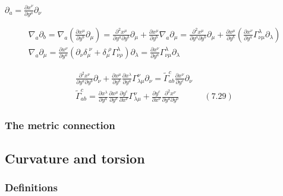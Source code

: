 \documentclass[twoside]{amsart}
\begin{document}
$\partial_a = \frac{ \partial x^{\nu} }{ \partial y^{\mu} } \partial_{\nu}$


\[
\begin{gathered}
  \nabla_a \partial_b = \nabla_a \left( \frac{ \partial x^{\mu }}{ \partial y^b } \partial_{\mu} \right) = \frac{ \partial^2 x^{\mu }}{ \partial y^a \partial y^b } \partial_{\mu} + \frac{ \partial x^{\mu }}{ \partial y^b} \nabla_a \partial_{\mu} = \frac{ \partial^2 x^{\mu }}{ \partial y^a \partial y^b } \partial_{\mu} + \frac{ \partial x^{\mu}}{ \partial y^b} \left( \frac{ \partial x^{\nu} }{ \partial y^a} \Gamma^{\lambda}_{\nu \mu } \partial_{\lambda} \right)  \\
\nabla_a \partial_{\mu} = \frac{ \partial x^{\nu } }{ \partial y^a} ( \partial_{\nu} \delta_{\mu}^{ \, \, \nu} + \delta_{\mu}^{ \, \, \rho } \Gamma^{\lambda}_{\nu \rho } ) \partial_{\lambda} = \frac{ \partial x^{\nu } }{ \partial y^a} \Gamma^{\lambda}_{\nu \mu} \partial_{\lambda}
\end{gathered}
\]

\[
\begin{gathered}
  \frac{ \partial^2 x^{\nu }}{ \partial y^a \partial y^b } \partial_{\nu} + \frac{ \partial x^{\mu}}{ \partial y^b} \frac{ \partial x^{\lambda} }{ \partial y^a } \Gamma^{\nu}_{ \lambda \mu } \partial_{\nu} = \widetilde{\Gamma}^c_{ab} \frac{ \partial x^{\nu }}{ \partial y^c} \partial_{\nu} \\  
  \widetilde{\Gamma}^c_{ab} = \frac{ \partial x^{\lambda}}{ \partial y^a } \frac{ \partial x^{\mu} }{ \partial y^b } \frac{ \partial y^c}{ \partial x^{\nu} } \Gamma^{\nu}_{\lambda \mu } + \frac{ \partial y^c}{ \partial x^{\nu }} \frac{ \partial^2 x^{\nu }}{ \partial y^a \partial y^b } \quad \quad \quad (7.29)
\end{gathered}
\]



\subsubsection{ The metric connection }

\subsection{ Curvature and torsion }

\subsubsection{ Definitions }
\end{document}
